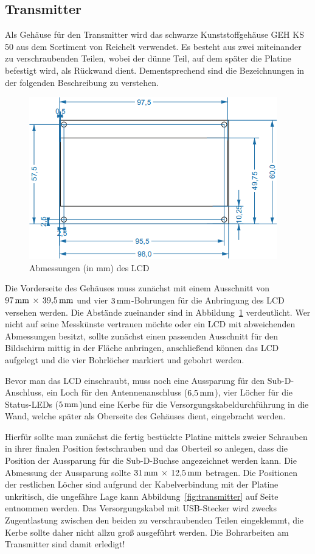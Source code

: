 \documentclass[pdftex, parskip, numbers=noenddot, toc=listof]{scrbook}
\begin{document}
			\subsection{Transmitter}
				Als Gehäuse für den Transmitter wird das schwarze Kunststoffgehäuse GEH KS 50 aus dem Sortiment von Reichelt verwendet. Es besteht aus zwei miteinander zu verschraubenden Teilen, wobei der dünne Teil, auf dem später die Platine befestigt wird, als Rückwand dient. Dementsprechend sind die Bezeichnungen in der folgenden Beschreibung zu verstehen.

				\begin{figure}
					\centering
					\includegraphics[]{bilder/lcddimensions}
					\caption{Abmessungen (in mm) des LCD}
					\label{fig:lcddimensions}
				\end{figure}

				Die Vorderseite des Gehäuses muss zunächst mit einem Ausschnitt von $\unit[97]{mm}\,\times\,\unit[39{,}5]{mm}$ und vier $\unit[3]{mm}$-Bohrungen für die Anbringung des LCD versehen werden. Die Abstände zueinander sind in Abbildung~\ref{fig:lcddimensions} verdeutlicht. Wer nicht auf seine Messkünste vertrauen möchte oder ein LCD mit abweichenden Abmessungen besitzt, sollte zunächst einen passenden Ausschnitt für den Bildschirm mittig in der Fläche anbringen, anschließend können das LCD aufgelegt und die vier Bohrlöcher markiert und gebohrt werden.

				Bevor man das LCD einschraubt, muss noch eine Aussparung für den Sub-D-Anschluss, ein Loch für den Antennenanschluss ($\unit[6{,}5]{mm}$), vier Löcher für die Status-LEDs ($\unit[5]{mm}$)und eine Kerbe für die Versorgungskabeldurchführung in die Wand, welche später als Oberseite des Gehäuses dient, eingebracht werden.

				Hierfür sollte man zunächst die fertig bestückte Platine mittels zweier Schrauben in ihrer finalen Position festschrauben und das Oberteil so anlegen, dass die Position der Aussparung für die Sub-D-Buchse angezeichnet werden kann. Die Abmessung der Aussparung sollte $\unit[31]{mm}\,\times\,\unit[12{,}5]{mm}$ betragen. Die Positionen der restlichen Löcher sind aufgrund der Kabelverbindung mit der Platine unkritisch, die ungefähre Lage kann Abbildung~\ref{fig:transmitter} auf Seite \pageref{fig:transmitter} entnommen werden. Das Versorgungskabel mit USB-Stecker wird zwecks Zugentlastung zwischen den beiden zu verschraubenden Teilen eingeklemmt, die Kerbe sollte daher nicht allzu groß ausgeführt werden. Die Bohrarbeiten am Transmitter sind damit erledigt!
\end{document}
